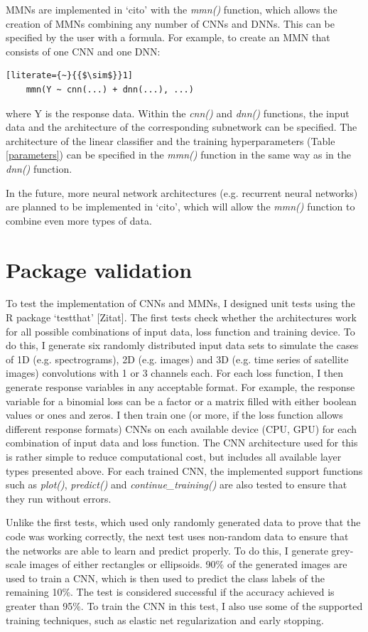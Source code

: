 \documentclass[12pt,twoside]{scrreport}
\newcommand{\pkg}[1]{`#1'}
\newcommand{\fn}[2][]{\textit{#2(}#1\textit{)}}
\begin{document}
MMNs are implemented in \pkg{cito} with the \fn{mmn} function, which allows the creation of MMNs combining any number of CNNs and DNNs. This can be specified by the user with a formula. For example, to create an MMN that consists of one CNN and one DNN:

\begin{lstlisting}[literate={~}{{$\sim$}}1]
	mmn(Y ~ cnn(...) + dnn(...), ...)
\end{lstlisting}

where Y is the response data. Within the \fn{cnn} and \fn{dnn} functions, the input data and the architecture of the corresponding subnetwork can be specified. The architecture of the linear classifier and the training hyperparameters (Table \ref{parameters}) can be specified in the \fn{mmn} function in the same way as in the \fn{dnn} function.

In the future, more neural network architectures (e.g. recurrent neural networks) are planned to be implemented in \pkg{cito}, which will allow the \fn{mmn} function to combine even more types of data. 

\section*{Package validation}
To test the implementation of CNNs and MMNs, I designed unit tests using the R package \pkg{testthat} [Zitat]. The first tests check whether the architectures work for all possible combinations of input data, loss function and training device. To do this, I generate six randomly distributed input data sets to simulate the cases of 1D (e.g. spectrograms), 2D (e.g. images) and 3D (e.g. time series of satellite images) convolutions with 1 or 3 channels each. For each loss function, I then generate response variables in any acceptable format. For example, the response variable for a binomial loss can be a factor or a matrix filled with either boolean values or ones and zeros. I then train one (or more, if the loss function allows different response formats) CNNs on each available device (CPU, GPU) for each combination of input data and loss function. The CNN architecture used for this is rather simple to reduce computational cost, but includes all available layer types presented above. For each trained CNN, the implemented support functions such as \fn{plot}, \fn{predict} and \fn{continue\_training} are also tested to ensure that they run without errors.

Unlike the first tests, which used only randomly generated data to prove that the code was working correctly, the next test uses non-random data to ensure that the networks are able to learn and predict properly. To do this, I generate grey-scale images of either rectangles or ellipsoids. 90\% of the generated images are used to train a CNN, which is then used to predict the class labels of the remaining 10\%. The test is considered successful if the accuracy achieved is greater than 95\%. To train the CNN in this test, I also use some of the supported training techniques, such as elastic net regularization and early stopping.
\end{document}
